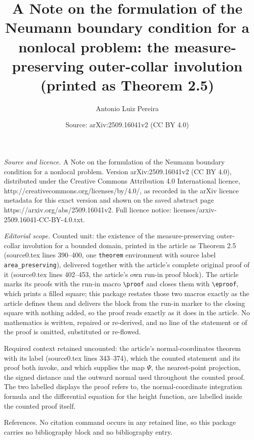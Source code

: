 \documentclass[10pt,a4paper]{amsart}
\title[A Note on the formulation of the Neumann boundary condition for a nonlocal problem]{A Note on the formulation of the Neumann boundary condition for a nonlocal problem: the measure-preserving outer-collar involution (printed as Theorem 2.5)}
\author{Antonio Luiz Pereira}
\date{Source: arXiv:2509.16041v2 (CC BY 4.0)}
\theoremstyle{plain}
\begin{document}
\maketitle

\noindent\emph{Source and licence.} A Note on the formulation of the Neumann boundary condition for a nonlocal problem. Version arXiv:2509.16041v2 (CC BY 4.0), distributed under the Creative Commons Attribution 4.0 International licence, http://creativecommons.org/licenses/by/4.0/, as recorded in the arXiv licence metadata for this exact version and shown on the saved abstract page https://arxiv.org/abs/2509.16041v2. Full licence notice: licenses/arxiv-2509.16041-CC-BY-4.0.txt.\par\smallskip

\noindent\textit{Editorial scope.} Counted unit: the existence of the measure-preserving outer-collar involution for a bounded domain, printed in the article as Theorem 2.5 (source0.tex lines 390--400, one \texttt{theorem} environment with source label \texttt{area\_preserving}), delivered together with the article's complete original proof of it (source0.tex lines 402--453, the article's own run-in proof block). The article marks its proofs with the run-in macro \texttt{\textbackslash proof} and closes them with \texttt{\textbackslash eproof}, which prints a filled square; this package restates those two macros exactly as the article defines them and delivers the block from the run-in marker to the closing square with nothing added, so the proof reads exactly as it does in the article. No mathematics is written, repaired or re-derived, and no line of the statement or of the proof is omitted, substituted or re-flowed.

Required context retained uncounted: the article's normal-coordinates theorem with its label (source0.tex lines 343--374), which the counted statement and its proof both invoke, and which supplies the map $\Psi$, the nearest-point projection, the signed distance and the outward normal used throughout the counted proof. The two labelled displays the proof refers to, the normal-coordinate integration formula and the differential equation for the height function, are labelled inside the counted proof itself.

References. No citation command occurs in any retained line, so this package carries no bibliography block and no bibliography entry.
\end{document}
